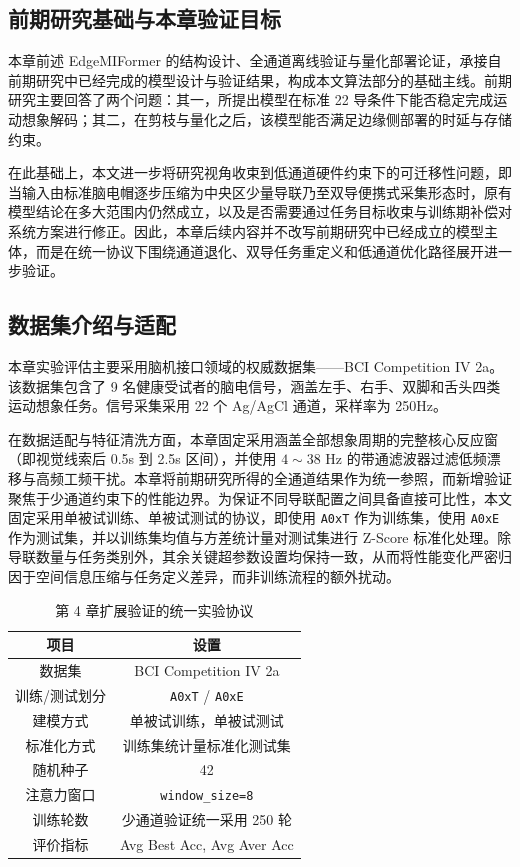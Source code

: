 \subsection{前期研究基础与本章验证目标}
本章前述 EdgeMIFormer 的结构设计、全通道离线验证与量化部署论证，承接自前期研究中已经完成的模型设计与验证结果，构成本文算法部分的基础主线。前期研究主要回答了两个问题：其一，所提出模型在标准 22 导条件下能否稳定完成运动想象解码；其二，在剪枝与量化之后，该模型能否满足边缘侧部署的时延与存储约束。

在此基础上，本文进一步将研究视角收束到低通道硬件约束下的可迁移性问题，即当输入由标准脑电帽逐步压缩为中央区少量导联乃至双导便携式采集形态时，原有模型结论在多大范围内仍然成立，以及是否需要通过任务目标收束与训练期补偿对系统方案进行修正。因此，本章后续内容并不改写前期研究中已经成立的模型主体，而是在统一协议下围绕通道退化、双导任务重定义和低通道优化路径展开进一步验证。

\subsection{数据集介绍与适配}
本章实验评估主要采用脑机接口领域的权威数据集——BCI Competition IV 2a。该数据集包含了 9 名健康受试者的脑电信号，涵盖左手、右手、双脚和舌头四类运动想象任务。信号采集采用 22 个 Ag/AgCl 通道，采样率为 250Hz。

在数据适配与特征清洗方面，本章固定采用涵盖全部想象周期的完整核心反应窗（即视觉线索后 0.5s 到 2.5s 区间），并使用 $4 \sim 38$ Hz 的带通滤波器过滤低频漂移与高频工频干扰。本章将前期研究所得的全通道结果作为统一参照，而新增验证聚焦于少通道约束下的性能边界。为保证不同导联配置之间具备直接可比性，本文固定采用单被试训练、单被试测试的协议，即使用 \texttt{A0xT} 作为训练集，使用 \texttt{A0xE} 作为测试集，并以训练集均值与方差统计量对测试集进行 Z-Score 标准化处理。除导联数量与任务类别外，其余关键超参数设置均保持一致，从而将性能变化严密归因于空间信息压缩与任务定义差异，而非训练流程的额外扰动。

\begin{table}[htbp]
    \centering
    \caption{第 4 章扩展验证的统一实验协议}
    \label{tab:chap4_protocol}
    \begin{tabular}{cc}
        \hline
        项目 & 设置 \\
        \hline
        数据集 & BCI Competition IV 2a \\
        训练/测试划分 & \texttt{A0xT} / \texttt{A0xE} \\
        建模方式 & 单被试训练，单被试测试 \\
        标准化方式 & 训练集统计量标准化测试集 \\
        随机种子 & 42 \\
        注意力窗口 & \texttt{window\_size=8} \\
        训练轮数 & 少通道验证统一采用 250 轮 \\
        评价指标 & Avg Best Acc, Avg Aver Acc \\
        \hline
    \end{tabular}
\end{table}

